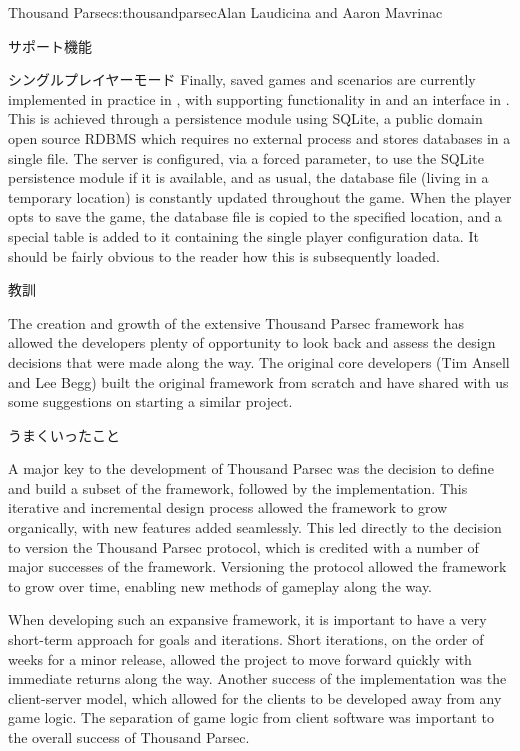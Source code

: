 \begin{aosachapter}{Thousand Parsec}{s:thousandparsec}{Alan Laudicina and Aaron Mavrinac}
\begin{aosasect1}{サポート機能}
\begin{aosasect2}{シングルプレイヤーモード}
Finally, saved games and scenarios are currently implemented in
practice in , with supporting functionality in
 and an interface in . This
is achieved through a persistence module using SQLite, a public domain
open source RDBMS which requires no external process and stores
databases in a single file. The server is configured, via a forced
parameter, to use the SQLite persistence module if it is available,
and as usual, the database file (living in a temporary location) is
constantly updated throughout the game. When the player opts to save
the game, the database file is copied to the specified location, and a
special table is added to it containing the single player
configuration data. It should be fairly obvious to the reader how this
is subsequently loaded.

\end{aosasect2}

\end{aosasect1}

\begin{aosasect1}{教訓}

The creation and growth of the extensive Thousand Parsec framework has
allowed the developers plenty of opportunity to look back and assess
the design decisions that were made along the way. The original core
developers (Tim Ansell and Lee Begg) built the original framework from
scratch and have shared with us some suggestions on starting a similar
project.

\begin{aosasect2}{うまくいったこと}

A major key to the development of Thousand Parsec was the decision to
define and build a subset of the framework, followed by the
implementation. This iterative and incremental design process allowed
the framework to grow organically, with new features added
seamlessly. This led directly to the decision to version the
Thousand Parsec protocol, which is credited with a number of major
successes of the framework. Versioning the protocol allowed the
framework to grow over time, enabling new methods of gameplay along
the way.

When developing such an expansive framework, it is important to have a
very short-term approach for goals and iterations. Short iterations, on the order of weeks for a minor release,
allowed the project to move forward quickly with immediate returns
along the way. Another success of the
implementation was the client-server model, which allowed for the
clients to be developed away from any game logic. The separation of
game logic from client software was important to the overall success
of Thousand Parsec.


\end{aosasect2}
\end{aosasect1}
\end{aosachapter}
